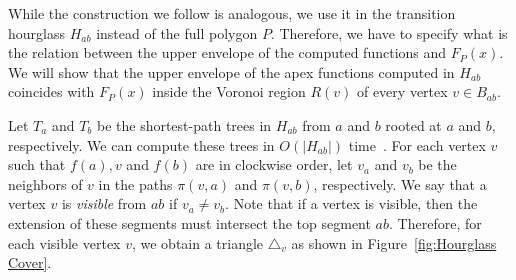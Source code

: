 \documentclass[a4paper,UKenglish]{lipics}
\newcommand{\F}[2]{\ensuremath{F_{\scriptscriptstyle #1}(#2)}}
\newcommand{\ff}[1]{\ensuremath{f(#1)}}
\newcommand{\p}[2]{\ensuremath{\pi(#1, #2)}}
\begin{document}
While the construction we follow is analogous, we use it in the transition hourglass $H_{ab}$ instead of the full polygon $P$. 
Therefore, we have to specify what is the relation between the upper envelope of the computed functions and $\F{P}{x}$. 
We will show that the upper envelope of the apex functions computed in $H_{ab}$ coincides with $\F{P}{x}$ inside the Voronoi region $R(v)$ of every vertex $v\in B_{ab}$.

Let $T_a$ and $T_b$ be the shortest-path trees in $H_{ab}$ from $a$ and $b$ rooted at $a$ and $b$, respectively. 
We can compute these trees in $O(|H_{ab}|)$ time~\cite{guibasShortestPathTree}. 
For each vertex $v$ such that  $\ff{a}, v$ and $\ff{b}$ are in clockwise order, let $v_a$ and $v_b$ be the neighbors of $v$ in the paths $\p{v}{a}$ and $\p{v}{ b}$, respectively.
We say that a vertex $v$ is \emph{visible} from $ab$ if $v_a\neq v_b$.
Note that if a vertex is visible, then the extension of these segments must intersect the top segment $ab$. 
Therefore, for each visible vertex $v$, we obtain a triangle $\triangle_v$ as shown in Figure~\ref{fig:Hourglass Cover}.
\end{document}
